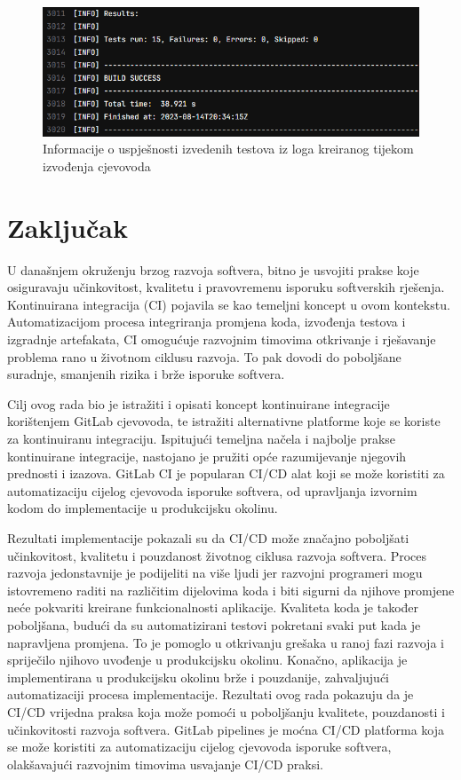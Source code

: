 \documentclass[a4paper,12pt,oneside]{article}
\begin{document}
\begin{figure}
    \centering
    \includegraphics[width=0.6\linewidth]{Slike/test-log.png}
    \caption{Informacije o uspješnosti izvedenih testova iz loga kreiranog tijekom izvođenja cjevovoda}
    \label{fig:test-log}
\end{figure}

\newpage
\section*{Zaključak}

U današnjem okruženju brzog razvoja softvera, bitno je usvojiti prakse koje osiguravaju učinkovitost, kvalitetu i pravovremenu isporuku softverskih rješenja. Kontinuirana integracija (CI) pojavila se kao temeljni koncept u ovom kontekstu. Automatizacijom procesa integriranja promjena koda, izvođenja testova i izgradnje artefakata, CI omogućuje razvojnim timovima otkrivanje i rješavanje problema rano u životnom ciklusu razvoja. To pak dovodi do poboljšane suradnje, smanjenih rizika i brže isporuke softvera.

Cilj ovog rada bio je istražiti i opisati koncept kontinuirane integracije korištenjem GitLab cjevovoda, te istražiti alternativne platforme koje se koriste za kontinuiranu integraciju. Ispitujući temeljna načela i najbolje prakse kontinuirane integracije, nastojano je pružiti opće razumijevanje njegovih prednosti i izazova. GitLab CI je popularan CI/CD alat koji se može koristiti za automatizaciju cijelog cjevovoda isporuke softvera, od upravljanja izvornim kodom do implementacije u produkcijsku okolinu.

Rezultati implementacije pokazali su da CI/CD može značajno poboljšati učinkovitost, kvalitetu i pouzdanost životnog ciklusa razvoja softvera. Proces razvoja jedonstavnije je podijeliti na više ljudi jer razvojni programeri mogu istovremeno raditi na različitim dijelovima koda i biti sigurni da njihove promjene neće pokvariti kreirane funkcionalnosti aplikacije. Kvaliteta koda je također poboljšana, budući da su automatizirani testovi pokretani svaki put kada je napravljena promjena. To je pomoglo u otkrivanju grešaka u ranoj fazi razvoja i spriječilo njihovo uvođenje u produkcijsku okolinu. Konačno, aplikacija je implementirana u produkcijsku okolinu brže i pouzdanije, zahvaljujući automatizaciji procesa implementacije.
Rezultati ovog rada pokazuju da je CI/CD vrijedna praksa koja može pomoći u poboljšanju kvalitete, pouzdanosti i učinkovitosti razvoja softvera. GitLab pipelines je moćna CI/CD platforma koja se može koristiti za automatizaciju cijelog cjevovoda isporuke softvera, olakšavajući razvojnim timovima usvajanje CI/CD praksi.
\end{document}

